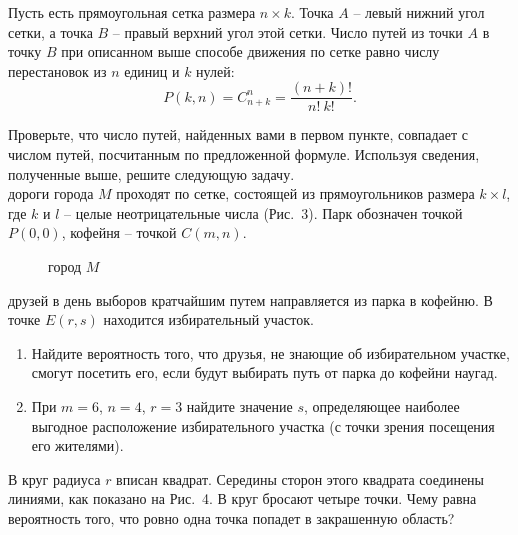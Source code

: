 \documentclass[a4paper, 12pt]{article}
\begin{document}
\begin{problem}
\begin{statement}
Пусть есть прямоугольная сетка размера $n\times k$. Точка $A$ -- левый нижний угол сетки, 
а точка $B$ -- правый верхний угол этой сетки. Число путей из точки $A$ в 
точку $B$ при описанном выше способе движения по сетке
равно числу перестановок из $n$ единиц и $k$ нулей:
$$
P(k, n) = C^n_{n+k} = \frac{(n+k)!}{n!~k!}.
$$
\end{statement}

\noindent Проверьте, что число путей, найденных вами в первом пункте, совпадает 
с числом путей, посчитанным по предложенной формуле. Используя сведения, полученные выше, 
решите следующую задачу.\medskip\\

 дороги города $M$ проходят по сетке, состоящей
из прямоугольников размера $k \times l$, где $k$ и $l$ -- 
целые неотрицательные числа (Рис.~3).
Парк обозначен точкой $P(0, 0)$, 
кофейня -- точкой $C(m, n)$.

\begin{figure}[ht!]
\centering
{}
\caption{город $M$}
\end{figure}

 друзей в день выборов кратчайшим путем 
направляется из парка в кофейню. 
В точке $E(r, s)$ находится избирательный участок. 

\begin{enumerate}
\item Найдите вероятность того, что друзья, не знающие об избирательном 
участке, смогут посетить его, если будут выбирать путь от парка до кофейни наугад.
\item При $m=6$, $n=4$, $r=3$ найдите значение $s$, определяющее наиболее выгодное 
расположение избирательного участка (с точки зрения посещения его жителями).
\end{enumerate}
\end{problem}

\begin{problem}
В круг радиуса $r$ вписан квадрат. 
Середины сторон этого квадрата соединены линиями, как показано на Рис.~4. 
В круг бросают четыре точки. Чему равна вероятность того, что ровно одна точка 
попадет в закрашенную область?
\end{problem}
\end{document}
